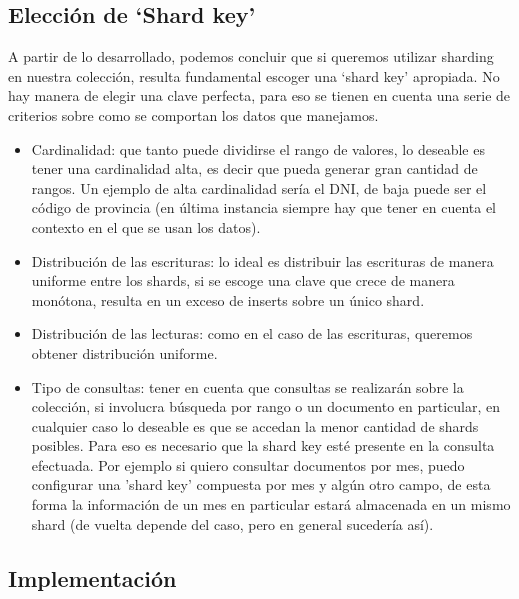 \subsection{Elección de `Shard key'}

A partir de lo desarrollado, podemos concluir que si queremos utilizar sharding en nuestra colección, resulta fundamental
escoger una `shard key' apropiada.
No hay manera de elegir una clave perfecta, para eso se tienen en cuenta una serie de criterios sobre como se comportan los
datos que manejamos.\\

\begin{itemize}
\item 
Cardinalidad: que tanto puede dividirse el rango de valores, lo deseable es tener una cardinalidad alta, es decir que pueda
generar gran cantidad de rangos. Un ejemplo de alta cardinalidad sería el DNI, de baja puede ser el código de provincia (en
última instancia siempre hay que tener en cuenta el contexto en el que se usan los datos).
\item 
Distribución de las escrituras: lo ideal es distribuir las escrituras de manera uniforme entre los shards, si se escoge una
clave que crece de manera monótona, resulta en un exceso de inserts sobre un único shard.
\item 
Distribución de las lecturas: como en el caso de las escrituras, queremos obtener distribución uniforme.
\item 
Tipo de consultas: tener en cuenta que consultas se realizarán sobre la colección, si involucra búsqueda por rango o un documento
en particular, en cualquier caso lo deseable es que se accedan la menor cantidad de shards posibles. Para eso es necesario
que la shard key esté presente en la consulta efectuada. Por ejemplo si quiero consultar documentos por mes, puedo configurar
una 'shard key' compuesta por mes y algún otro campo, de esta forma la información de un mes en particular estará almacenada en un mismo shard
(de vuelta depende del caso, pero en general sucedería así).\end{itemize}


\subsection{Implementación}

